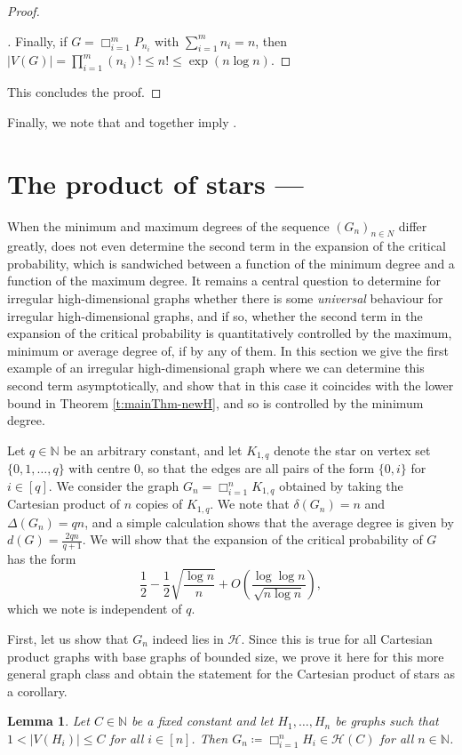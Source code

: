 \documentclass[reqno,a4paper,11pt]{amsart}
\newtheorem{lemma}[theorem]{Lemma}
\theoremstyle{definition}
\newcommand{\car}{\mathbin{\Box}}
\renewcommand{\leq}{\leqslant}
\begin{document}
\begin{proof}
  \begin{proof}[]\let\qed\relax
    Finally, if $G= \car_{i=1}^m P_{n_i}$ with $\sum_{i=1}^m n_i =n$, then $|V(G)| = \prod_{i=1}^m (n_i)! \leq n! \leq \exp( n \log n)$.
  \end{proof}
  This concludes the proof.
\end{proof}

Finally, we note that  and  together imply .


\section{The product of stars --- }\label{s:productstars}

When the minimum and maximum degrees of the sequence $(G_n)_{n\in N}$ differ greatly,  does not even determine the second term in the expansion of the critical probability, which is sandwiched between a function of the minimum degree and a function of the maximum degree.
It remains a central question to determine for irregular high-dimensional graphs whether there is some \emph{universal} behaviour for irregular high-dimensional graphs, and if so, whether the second term in the expansion of the critical probability is quantitatively controlled by the maximum, minimum or average degree of, if by any of them.
In this section we give the first example of an irregular high-dimensional graph where we can determine this second term asymptotically, and show that in this case it coincides with the lower bound in Theorem \ref{t:mainThm-newH}, and so is controlled by the minimum degree.

Let $q \in \mathbb{N}$ be an arbitrary constant, and let $K_{1,q}$ denote the star on vertex set $\{0, 1, \ldots, q\}$ with centre $0$, so that the edges are all pairs of the form $\{0, i\}$ for $i \in [q]$.
We consider the graph $G_n = \car_{i=1}^n K_{1, q}$ obtained by taking the Cartesian product of $n$ copies of $K_{1,q}$.
We note that $\delta(G_n) = n$ and $\Delta(G_n) = qn$, and a simple calculation shows that the average degree is given by $d(G) = \frac{2qn}{q+1}$.
We will show that the expansion of the critical probability of $G$ has the form
\[
  \frac{1}{2} - \frac{1}{2}\sqrt{\frac{\log n}{n}} + O\left(\frac{\log \log n}{\sqrt{n \log n}}\right),
\]
which we note is independent of $q$.

First, let us show that $G_n$ indeed lies in $\mathcal{H}$.
Since this is true for all Cartesian product graphs with base graphs of bounded size, we prove it here for this more general graph class and obtain the statement for the Cartesian product of stars as a corollary.
\begin{lemma}\label{l:prodinH}
  Let $C \in \mathbb{N}$ be a fixed constant and let $H_1,\ldots, H_n$ be graphs such that $1< |V(H_i)| \leq C$ for all $i \in [n]$.
  Then $G_n \coloneqq \car_{i=1}^n H_i \in \mathcal{H}(C)$ for all $n\in \mathbb N$.
\end{lemma}
\end{document}
